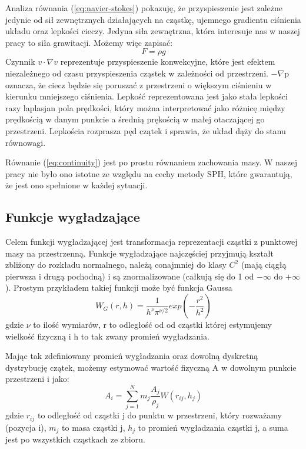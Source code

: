 \documentclass[polish, 12pt]{aghthesis}
\begin{document}
			Analiza równania (\ref{eq:navier-stokes}) pokazuję, że przyspieszenie jest zależne jedynie od sił zewnętrznych działających na cząstkę, ujemnego gradientu ciśnienia układu oraz lepkości cieczy. Jedyna siła zewnętrzna, która interesuje nas w naszej pracy to siła grawitacji. Możemy więc zapisać: \[F={\rho}g \label {eq:gravity_force} \tag{3} \] Czynnik $v {\cdot} {\nabla} v$ reprezentuje przyspieszenie konwekcyjne, które jest efektem niezależnego od czasu przyspieszenia cząstek w zależności od przestrzeni. $-{\nabla}$p oznacza, że ciecz będzie się poruszać z przestrzeni o większym ciśnieniu w kierunku mniejszego ciśnienia. Lepkość reprezentowana jest jako stała lepkości razy laplasjan pola prędkości, który można interpretować jako różnicę między prędkością w danym punkcie a średnią prękością w małej otaczającej go przestrzeni. Lepkościa rozprasza pęd czątek i sprawia, że układ dąży do stanu równowagi.
			
			Równanie (\ref{eq:continuity}) jest po prostu równaniem zachowania masy. W naszej pracy nie było ono istotne ze względu na cechy metody SPH, które gwarantują, że jest ono spełnione w każdej sytuacji.
			 
		\subsection{Funkcje wygładzające}
			
			Celem funkcji wygładzającej jest transformacja reprezentacji cząstki z punktowej masy na przestrzenną. Funkcje wygładzające najczęściej przyjmują kształt zbliżony do rozkładu normalnego, należą conajmniej do klasy ${C^2}$ (mają ciągłą pierwsza i drugą pochodną) i są znormalizowane (całkują się do 1 od $-{\infty}$ do $+{\infty}$). Prostym przykładem takiej funkcji może być funkcja Gaussa \[W_G(r,h)=\frac{1}{h^{\nu}\pi^{{\nu}/2}}exp(-\frac{r^2}{h^2}) \label{eq:gaussian} \tag{4}\] gdzie ${\nu}$ to ilość wymiarów, r to odległość od od cząstki której estymujemy wielkość fizyczną i h to tak zwany promień wygładzania.
			
			Mając tak zdefiniowany promień wygładzania oraz dowolną dyskretną dystrybucję czątek, możemy estymować wartość fizyczną A w dowolnym punkcie przestrzeni i jako: \[{A}_i=\sum_{j=1}^{N}m_j\frac{A_j}{\rho_j}W(r_{ij},h_j) \label{eq:calc_all} \tag{5}\] gdzie ${r_{ij}}$ to odległość od cząstki j do punktu w przestrzeni, który rozważamy (pozycja i), ${m_j}$ to masa cząstki j, ${h_j}$ to promień wygładzania cząstki j, a suma jest po wszystkich cząstkach ze zbioru. 
			
\end{document}
